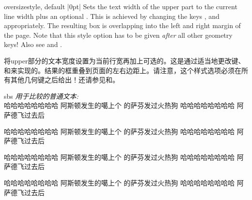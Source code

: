 \begin{docTcbKey}{oversize}{}{style, default |0pt|}
Sets the text width of the upper part to the current line width plus an
optional .
This is achieved by changing the keys 
, and
 appropriately.
The resulting box is overlapping into the left and right margin of
the page.
Note that this style option has to be given \emph{after} all other
geometry keys!
Also see  and .

将upper部分的文本宽度设置为当前行宽再加上可选的。这是通过适当地更改键、和来实现的。结果的框重叠到页面的左右边距上。请注意，这个样式选项必须在所有其他几何键之后给出！还请参见和。







\begin{dispExample*}{sbs}
\newcommand\sometextuseonece{%
哈哈哈哈哈哈哈哈%
阿斯顿发生的噶上个%
的萨芬发过火热狗%
哈哈哈哈哈哈哈哈%
阿萨德飞过去后%
}
\textit{用于比较的普通文本:}\\
\sometextuseonece

\begin{tcolorbox}[oversize,
title=Oversized box]
\sometextuseonece
\end{tcolorbox}

\begin{tcolorbox}[oversize=2mm,
title=Oversized box]
  \sometextuseonece
  \end{tcolorbox}

\begin{tcolorbox}[title=Normal box]
\sometextuseonece
\end{tcolorbox}
\end{dispExample*}


\end{docTcbKey}



  